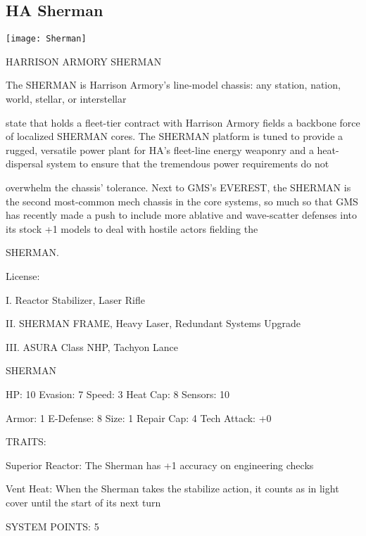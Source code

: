 \subsection{HA Sherman}

\begin{center}
    \texttt{[image: Sherman]}
\end{center}

                              HARRISON ARMORY SHERMAN

The SHERMAN is Harrison Armory's line-model chassis: any station, nation, world, stellar, or interstellar

state that holds a fleet-tier contract with Harrison Armory fields a backbone force of localized SHERMAN
cores. The SHERMAN platform is tuned to provide a rugged, versatile power plant for HA's fleet-line
energy weaponry and a heat-dispersal system to ensure that the tremendous power requirements do not

overwhelm the chassis' tolerance. Next to GMS's EVEREST, the SHERMAN is the second most-common
mech chassis in the core systems, so much so that GMS has recently made a push to include more
ablative and wave-scatter defenses into its stock +1 models to deal with hostile actors fielding the

SHERMAN.

                                                  License:

I. Reactor Stabilizer, Laser Rifle

II. SHERMAN FRAME, Heavy Laser, Redundant Systems Upgrade

III. ASURA Class NHP, Tachyon Lance


                                                SHERMAN

 HP: 10         Evasion: 7                            Speed: 3           Heat Cap: 8       Sensors: 10

 Armor: 1       E-Defense: 8                          Size: 1            Repair Cap: 4     Tech Attack:
                                                                                           +0

                                                  TRAITS:

 Superior Reactor: The Sherman has +1 accuracy on engineering checks

 Vent Heat: When the Sherman takes the stabilize action, it counts as in light cover until the start of its
 next turn

                                            SYSTEM POINTS: 5

